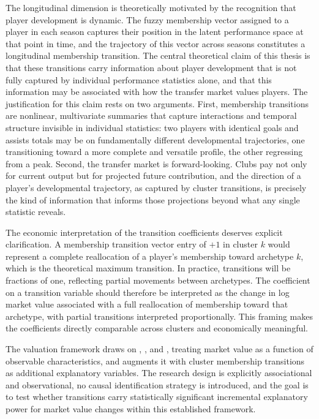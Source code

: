 \documentclass[a4paper,11pt]{report}
\begin{document}
The longitudinal dimension is theoretically motivated by the recognition that player development is dynamic. The fuzzy membership vector assigned to a player in each season captures their position in the latent performance space at that point in time, and the trajectory of this vector across seasons constitutes a longitudinal membership transition. The central theoretical claim of this thesis is that these transitions carry information about player development that is not fully captured by individual performance statistics alone, and that this information may be associated with how the transfer market values players. The justification for this claim rests on two arguments. First, membership transitions are nonlinear, multivariate summaries that capture interactions and temporal structure invisible in individual statistics: two players with identical goals and assists totals may be on fundamentally different developmental trajectories, one transitioning toward a more complete and versatile profile, the other regressing from a peak. Second, the transfer market is forward-looking. Clubs pay not only for current output but for projected future contribution, and the direction of a player's developmental trajectory, as captured by cluster transitions, is precisely the kind of information that informs those projections beyond what any single statistic reveals.

The economic interpretation of the transition coefficients deserves explicit clarification. A membership transition vector entry of $+1$ in cluster $k$ would represent a complete reallocation of a player's membership toward archetype $k$, which is the theoretical maximum transition. In practice, transitions will be fractions of one, reflecting partial movements between archetypes. The coefficient on a transition variable should therefore be interpreted as the change in log market value associated with a full reallocation of membership toward that archetype, with partial transitions interpreted proportionally. This framing makes the coefficients directly comparable across clusters and economically meaningful.

The valuation framework draws on \cite{franceschi2024determinants}, \cite{poli2024statistical}, and \cite{muller2017beyond}, treating market value as a function of observable characteristics, and augments it with cluster membership transitions as additional explanatory variables. The research design is explicitly associational and observational, no causal identification strategy is introduced, and the goal is to test whether transitions carry statistically significant incremental explanatory power for market value changes within this established framework.
\end{document}
